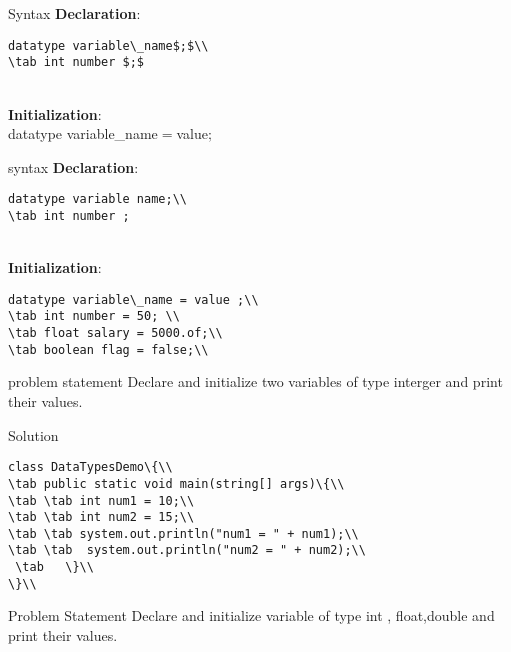 \documentclass[aspectratio=169,14pt,usenames,dvipsnames]{beamer}
\newcommand\tab[1][1cm]{\hspace*{#1}}
\begin{document}
\begin{frame}{Syntax}
\textbf{Declaration$:$}\\
\begin{lstlisting}
datatype variable\_name$;$\\
\tab int number $;$
\end{lstlisting}\\
\textbf{Initialization$:$}\\
datatype variable\_name$=$value$;$
\end{frame}


\begin{frame}{syntax}
\textbf{Declaration$:$}\\
\begin{lstlisting}
datatype variable name;\\
\tab int number ;
\end{lstlisting}\\
\textbf{Initialization$:$}\\
\begin{lstlisting}
datatype variable\_name = value ;\\
\tab int number = 50; \\
\tab float salary = 5000.of;\\
\tab boolean flag = false;\\
\end{lstlisting}
\end{frame}

\begin{frame}{problem statement}
Declare and initialize two variables of type interger and print their values.
\end{frame}
\begin{frame}{Solution}
\begin{lstlisting}
class DataTypesDemo\{\\
\tab public static void main(string[] args)\{\\
\tab \tab int num1 = 10;\\
\tab \tab int num2 = 15;\\
\tab \tab system.out.println("num1 = " + num1);\\
\tab \tab  system.out.println("num2 = " + num2);\\
 \tab   \}\\
\}\\
\end{lstlisting}
\end{frame}

\begin{frame}{Problem Statement}
Declare and initialize variable of type int , float,double and print their values.
\end{frame}
\end{document}
